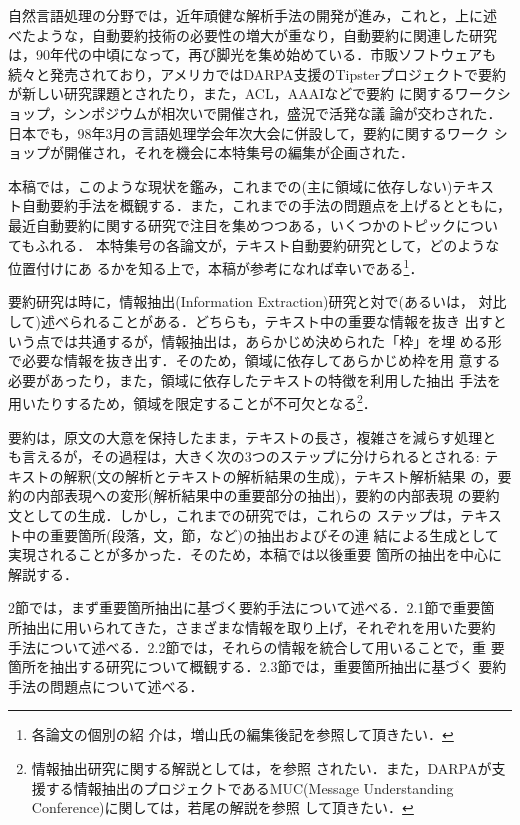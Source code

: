 自然言語処理の分野では，近年頑健な解析手法の開発が進み，これと，上に述
べたような，自動要約技術の必要性の増大が重なり，自動要約に関連した研究
は，90年代の中頃になって，再び脚光を集め始めている．市販ソフトウェアも
続々と発売されており，アメリカではDARPA支援のTipsterプロジェクトで要約
が新しい研究課題とされたり\cite{hand:97:a}，また，ACL，AAAIなどで要約
に関するワークショップ，シンポジウムが相次いで開催され，盛況で活発な議
論が交わされた．
日本でも，98年3月の言語処理学会年次大会に併設して，要約に関するワーク
ショップが開催され，それを機会に本特集号の編集が企画された．

本稿では，このような現状を鑑み，これまでの(主に領域に依存しない)テキス
ト自動要約手法を概観する．また，これまでの手法の問題点を上げるとともに，
最近自動要約に関する研究で注目を集めつつある，いくつかのトピックについ
てもふれる．
本特集号の各論文が，テキスト自動要約研究として，どのような位置付けにあ
るかを知る上で，本稿が参考になれば幸いである\footnote{各論文の個別の紹
介は，増山氏の編集後記を参照して頂きたい．}．

要約研究は時に，情報抽出(Information Extraction)研究と対で(あるいは，
対比して)述べられることがある．どちらも，テキスト中の重要な情報を抜き
出すという点では共通するが，情報抽出は，あらかじめ決められた「枠」を埋
める形で必要な情報を抜き出す．そのため，領域に依存してあらかじめ枠を用
意する必要があったり，また，領域に依存したテキストの特徴を利用した抽出
手法を用いたりするため，領域を限定することが不可欠となる\footnote{
情報抽出研究に関する解説としては，\cite{cowie:96:a,sekine:99:a}を参照
されたい．また，DARPAが支援する情報抽出のプロジェクトであるMUC(Message
Understanding Conference)に関しては，若尾の解説\cite{wakao:96:a}を参照
して頂きたい．
}．

要約は，原文の大意を保持したまま，テキストの長さ，複雑さを減らす処理と
も言えるが，その過程は，大きく次の3つのステップに分けられるとされる: 
テキストの解釈(文の解析とテキストの解析結果の生成)，テキスト解析結果
の，要約の内部表現への変形(解析結果中の重要部分の抽出)，要約の内部表現
の要約文としての生成．しかし，これまでの研究では，これらの
ステップは，テキスト中の重要箇所(段落，文，節，など)の抽出およびその連
結による生成として実現されることが多かった．そのため，本稿では以後重要
箇所の抽出を中心に解説する．

2節では，まず重要箇所抽出に基づく要約手法について述べる．2.1節で重要箇
所抽出に用いられてきた，さまざまな情報を取り上げ，それぞれを用いた要約
手法について述べる．2.2節では，それらの情報を統合して用いることで，重
要箇所を抽出する研究について概観する．2.3節では，重要箇所抽出に基づく
要約手法の問題点について述べる．

